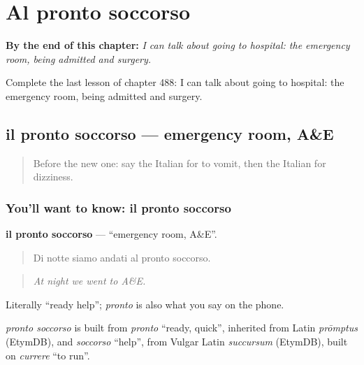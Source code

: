 
\chapter{Al pronto soccorso}
\label{ch:it-al-pronto-soccorso}

\begin{chapteropening}
\textbf{By the end of this chapter:} \emph{I can talk about going to hospital: the emergency room, being admitted and surgery.}

Complete the last lesson of chapter 488: I can talk about going to hospital: the emergency room, being admitted and surgery.
\end{chapteropening}

\section[il pronto soccorso]{il pronto soccorso — emergency room, A\&E}

\label{lesson:IT-C488-pronto-soccorso}



\begin{quote}
Before the new one: say the Italian for to vomit, then the Italian for dizziness.
\end{quote}

\subsection*{You'll want to know: il pronto soccorso}
\textbf{il pronto soccorso} — \textquotedblleft{}emergency room, A\&E\textquotedblright{}.

\begin{quote}
Di notte siamo andati al pronto soccorso.
\end{quote}

\begin{quote}
\emph{At night we went to A\&E.}
\end{quote}

Literally \textquotedblleft{}ready help\textquotedblright{}; \emph{pronto} is also what you say on the phone.

\begin{cousinweb}
\emph{pronto soccorso} is built from \emph{pronto} \textquotedblleft{}ready, quick\textquotedblright{}, inherited from Latin \emph{prōmptus} (EtymDB), and \emph{soccorso} \textquotedblleft{}help\textquotedblright{}, from Vulgar Latin \emph{succursum} (EtymDB), built on \emph{currere} \textquotedblleft{}to run\textquotedblright{}.
\end{cousinweb}

